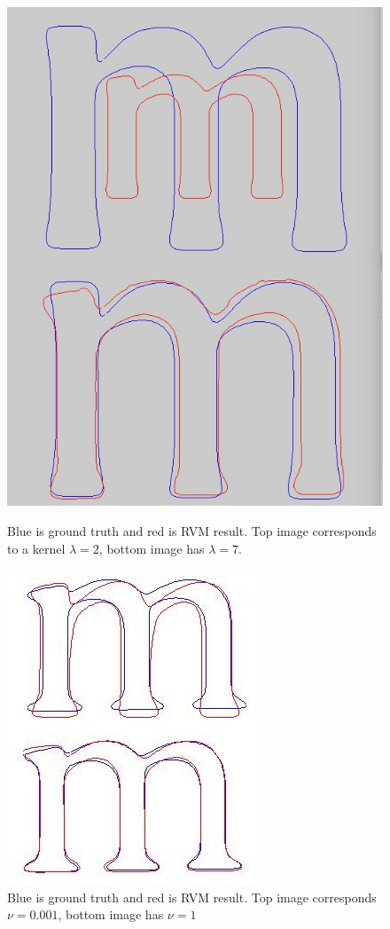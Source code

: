 \documentclass[12pt]{article}
\begin{document}
\begin{figure}[h]
	\centering
	\begin{minipage}[t]{.45\textwidth}
		\centering
		\includegraphics[scale=0.25]{images/lambda2_7}
		\caption{Blue is ground truth and red is RVM result. Top image corresponds to a kernel $\lambda=2$, bottom image has $\lambda=7$.}
		\label{fig:lambda}
	\end{minipage}\hfill
	\begin{minipage}[t]{.45\textwidth}
		\centering
		\includegraphics[scale=0.5]{images/nu1_0_01}
		\caption{Blue is ground truth and red is RVM result. Top image corresponds  $\nu=0.001$, bottom image has $\nu=1$}
		\label{fig:nu}
	\end{minipage}
\end{figure}
\end{document}
